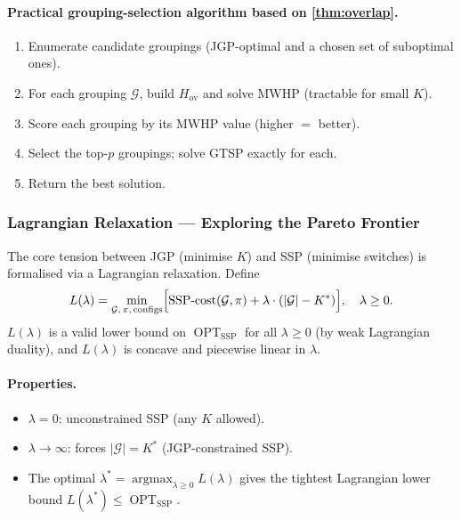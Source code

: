\documentclass[11pt,a4paper]{article}
\theoremstyle{plain}
\theoremstyle{definition}
\DeclareMathOperator{\OPT}{OPT}
\DeclareMathOperator*{\argmax}{argmax}
\newcommand{\calG}{\mathcal{G}}     %
\newcommand{\Kstar}{K^{*}}          %
\begin{document}
\paragraph{Practical grouping-selection algorithm based on \cref{thm:overlap}.}
\begin{enumerate}[label=\arabic*.]
  \item Enumerate candidate groupings (JGP-optimal and a chosen set of suboptimal ones).
  \item For each grouping $\calG$, build $H_{\mathrm{ov}}$ and solve MWHP
        (tractable for small $K$).
  \item Score each grouping by its MWHP value (higher $=$ better).
  \item Select the top-$p$ groupings; solve GTSP exactly for each.
  \item Return the best solution.
\end{enumerate}

\subsubsection{Lagrangian Relaxation --- Exploring the Pareto Frontier}
\label{sec:lagrangian}

The core tension between JGP (minimise $K$) and SSP (minimise switches) is formalised
via a Lagrangian relaxation.
Define
\[
  L(\lambda)
  = \min_{\calG,\,\pi,\,\text{configs}}
    \Bigl[\mathrm{SSP\text{-}cost}(\calG,\pi)
          + \lambda\cdot(|\calG| - \Kstar)\Bigr],
  \quad \lambda \ge 0.
\]
$L(\lambda)$ is a valid lower bound on $\OPT_{\text{SSP}}$ for all $\lambda \ge 0$
(by weak Lagrangian duality), and $L(\lambda)$ is concave and piecewise linear in $\lambda$.

\paragraph{Properties.}
\begin{itemize}
  \item $\lambda = 0$: unconstrained SSP (any $K$ allowed).
  \item $\lambda \to \infty$: forces $|\calG| = \Kstar$ (JGP-constrained SSP).
  \item The optimal $\lambda^* = \argmax_{\lambda \ge 0} L(\lambda)$ gives the tightest
        Lagrangian lower bound $L(\lambda^*) \le \OPT_{\text{SSP}}$.
\end{itemize}
\end{document}
